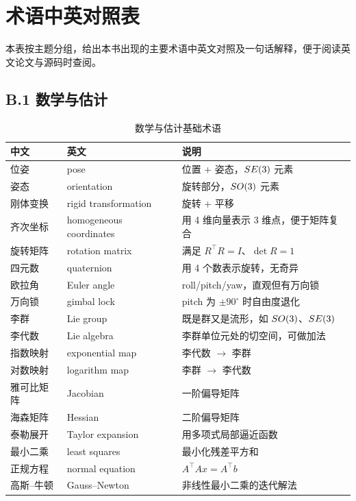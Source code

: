 \chapter{术语中英对照表}

\noindent 本表按主题分组，给出本书出现的主要术语中英文对照及一句话解释，便于阅读英文论文与源码时查阅。

\section*{B.1 数学与估计}

\begin{table}[htbp]
  \centering
  \caption{数学与估计基础术语}\label{tab:b-math}
  \footnotesize
  \begin{tabular}{llp{6.6cm}}
    \toprule
    中文 & 英文 & 说明 \\
    \midrule
    位姿 & pose & 位置 + 姿态，$SE(3)$ 元素 \\
    姿态 & orientation & 旋转部分，$SO(3)$ 元素 \\
    刚体变换 & rigid transformation & 旋转 + 平移 \\
    齐次坐标 & homogeneous coordinates & 用 4 维向量表示 3 维点，便于矩阵复合 \\
    旋转矩阵 & rotation matrix & 满足 $R^{\top}R=I$、$\det R=1$ \\
    四元数 & quaternion & 用 4 个数表示旋转，无奇异 \\
    欧拉角 & Euler angle & roll/pitch/yaw，直观但有万向锁 \\
    万向锁 & gimbal lock & pitch 为 $\pm90^\circ$ 时自由度退化 \\
    李群 & Lie group & 既是群又是流形，如 $SO(3)$、$SE(3)$ \\
    李代数 & Lie algebra & 李群单位元处的切空间，可做加法 \\
    指数映射 & exponential map & 李代数 $\to$ 李群 \\
    对数映射 & logarithm map & 李群 $\to$ 李代数 \\
    雅可比矩阵 & Jacobian & 一阶偏导矩阵 \\
    海森矩阵 & Hessian & 二阶偏导矩阵 \\
    泰勒展开 & Taylor expansion & 用多项式局部逼近函数 \\
    最小二乘 & least squares & 最小化残差平方和 \\
    正规方程 & normal equation & $A^{\top}Ax=A^{\top}b$ \\
    高斯--牛顿 & Gauss--Newton & 非线性最小二乘的迭代解法 \\

\end{tabular}
\end{table}
